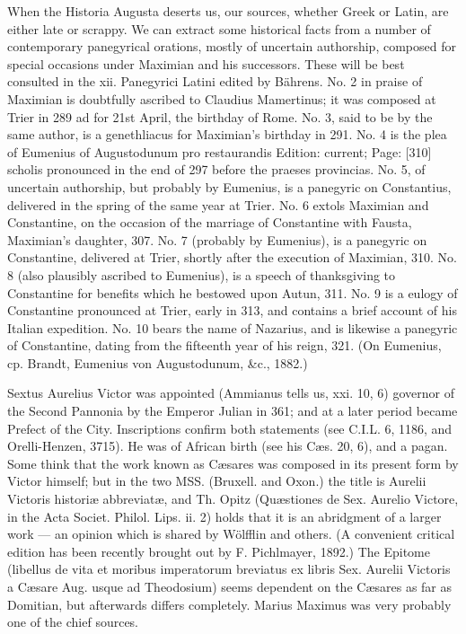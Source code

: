 When the Historia Augusta deserts us, our sources, whether Greek or Latin, are either late or scrappy. We can extract some historical facts from a number of contemporary panegyrical orations, mostly of uncertain authorship, composed for special occasions under Maximian and his successors. These will be best consulted in the xii. Panegyrici Latini edited by Bährens. No. 2 in praise of Maximian is doubtfully ascribed to Claudius Mamertinus; it was composed at Trier in 289 ad for 21st April, the birthday of Rome. No. 3, said to be by the same author, is a genethliacus for Maximian\texthebrew{}’s birthday in 291. No. 4 is the plea of Eumenius of Augustodunum pro restaurandis Edition: current; Page: [310] scholis pronounced in the end of 297 before the praeses provincias. No. 5, of uncertain authorship, but probably by Eumenius, is a panegyric on Constantius, delivered in the spring of the same year at Trier. No. 6 extols Maximian and Constantine, on the occasion of the marriage of Constantine with Fausta, Maximian\texthebrew{}’s daughter, 307. No. 7 (probably by Eumenius), is a panegyric on Constantine, delivered at Trier, shortly after the execution of Maximian, 310. No. 8 (also plausibly ascribed to Eumenius), is a speech of thanksgiving to Constantine for benefits which he bestowed upon Autun, 311. No. 9 is a eulogy of Constantine pronounced at Trier, early in 313, and contains a brief account of his Italian expedition. No. 10 bears the name of Nazarius, and is likewise a panegyric of Constantine, dating from the fifteenth year of his reign, 321. (On Eumenius, cp. Brandt, Eumenius von Augustodunum, \&c., 1882.)

Sextus Aurelius Victor was appointed (Ammianus tells us, xxi. 10, 6) governor of the Second Pannonia by the Emperor Julian in 361; and at a later period became Prefect of the City. Inscriptions confirm both statements (see C.I.L. 6, 1186, and Orelli-Henzen, 3715). He was of African birth (see his Cæs. 20, 6), and a pagan. Some think that the work known as Cæsares was composed in its present form by Victor himself; but in the two MSS. (Bruxell. and Oxon.) the title is Aurelii Victoris historiæ abbreviatæ, and Th. Opitz (Quæstiones de Sex. Aurelio Victore, in the Acta Societ. Philol. Lips. ii. 2) holds that it is an abridgment of a larger work \texthebrew{—} an opinion which is shared by Wölfflin and others. (A convenient critical edition has been recently brought out by F. Pichlmayer, 1892.) The Epitome (libellus de vita et moribus imperatorum breviatus ex libris Sex. Aurelii Victoris a Cæsare Aug. usque ad Theodosium) seems dependent on the Cæsares as far as Domitian, but afterwards differs completely. Marius Maximus was very probably one of the chief sources.

